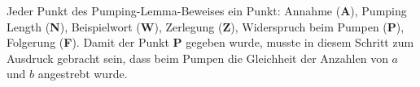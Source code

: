 \begin{bewertung}
Jeder Punkt des Pumping-Lemma-Beweises ein Punkt:
Annahme ({\bf A}), Pumping Length ({\bf N}), Beispielwort ({\bf W}),
Zerlegung ({\bf Z}), Widerspruch beim Pumpen ({\bf P}), 
Folgerung ({\bf F}).
Damit der Punkt {\bf P} gegeben wurde, musste in diesem Schritt zum 
Ausdruck gebracht sein, dass beim Pumpen die Gleichheit der Anzahlen
von $a$ und $b$ angestrebt wurde.
\end{bewertung}


